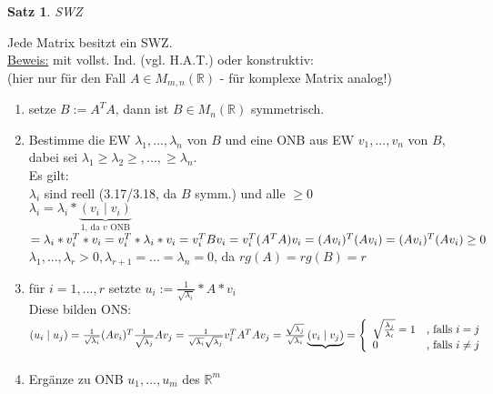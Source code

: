 \documentclass[a4paper,11pt]{article}
\newtheorem{satz}[definition]{Satz}
\begin{document}
\begin{satz}
	SWZ
\end{satz}
Jede Matrix besitzt ein SWZ. \\
\underline{Beweis:} mit vollst. Ind. (vgl. H.A.T.) oder konstruktiv: \\
(hier nur für den Fall $A\in M_{m,n}(\mathbb{R})$ - für komplexe Matrix analog!)
\begin{enumerate}[label=\arabic*)]
	\item setze $B:=A^TA$, dann ist $B\in M_n(\mathbb{R})$ symmetrisch.
	\item Bestimme die EW $\lambda_1,...,\lambda_n$ von $B$ und eine ONB aus EW $v_1,...,v_n$ von $B$, dabei sei $\lambda_1\geq\lambda_2\geq,...,\geq\lambda_n$. \\
	Es gilt: \\
	$\lambda_i$ sind reell (3.17/3.18, da $B$ symm.) und alle $\geq0$ \\
	$\lambda_i=\lambda_i*\underbrace{(v_i\mid v_i)}_{\text{1, da $v$ ONB}}$ \\
	$= \lambda_i*v_i^T*v_i \\
	= v_i^T*\lambda_i*v_i \\
	= v_i^TBv_i \\
	= v_i^T(A^TA)v_i \\
	= (Av_i)^T(Av_i) \\
	= (Av_i)^T(Av_i)\geq0$ \\
	$\lambda_1,...,\lambda_r>0,\lambda_{r+1}=...=\lambda_n=0$, da $rg(A)=rg(B)=r$
	\item für $i=1,...,r$ setzte $u_i:=\frac{1}{\sqrt{\lambda_i}}*A*v_i$ \\
	Diese bilden ONS: \\
	$(u_i\mid u_j) \\
	= \frac{1}{\sqrt{\lambda_i}}(Av_i)^T\frac{1}{\sqrt{\lambda_j}}Av_j \\
	= \frac{1}{\sqrt{\lambda_i}\sqrt{\lambda_j}}v_i^TA^TAv_j \\
	= \frac{\sqrt{\lambda_j}}{\sqrt{\lambda_i}}\underbrace{(v_i\mid v_j)}_{}=\left\{\begin{array}{ll}\sqrt{\frac{\lambda_j}{\lambda_i}}=1&\text{, falls }i=j \\ 0 & \text{, falls }i\neq j\end{array}\right.$ 
	\item Ergänze zu ONB $u_1,...,u_m$ des $\mathbb{R}^m$
	
	\newpage
	

\end{enumerate}
\end{document}
